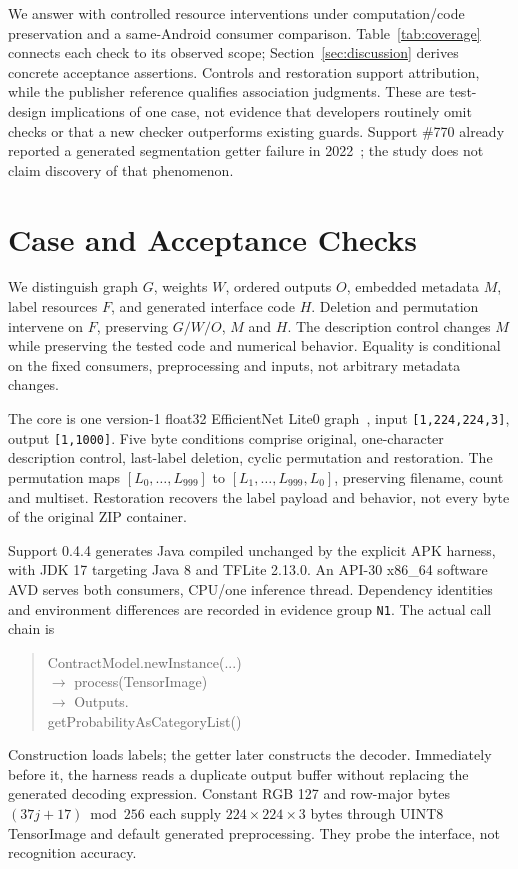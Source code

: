 \documentclass[10pt,conference]{IEEEtran}
\newcommand{\code}[1]{\texttt{#1}}
\begin{document}
We answer with controlled resource interventions under computation/code preservation and a same-Android consumer comparison. Table~\ref{tab:coverage} connects each check to its observed scope; Section~\ref{sec:discussion} derives concrete acceptance assertions. Controls and restoration support attribution, while the publisher reference qualifies association judgments. These are test-design implications of one case, not evidence that developers routinely omit checks or that a new checker outperforms existing guards. Support \#770 already reported a generated segmentation getter failure in 2022~\cite{support770,support770reply}; the study does not claim discovery of that phenomenon.

\section{Case and Acceptance Checks}
\label{sec:setup}
We distinguish graph $G$, weights $W$, ordered outputs $O$, embedded metadata $M$, label resources $F$, and generated interface code $H$. Deletion and permutation intervene on $F$, preserving $G/W/O$, $M$ and $H$. The description control changes $M$ while preserving the tested code and numerical behavior. Equality is conditional on the fixed consumers, preprocessing and inputs, not arbitrary metadata changes.

The core is one version-1 float32 EfficientNet Lite0 graph~\cite{efficientnet}, input \code{[1,224,224,3]}, output \code{[1,1000]}. Five byte conditions comprise original, one-character description control, last-label deletion, cyclic permutation and restoration. The permutation maps $[L_0,\ldots,L_{999}]$ to $[L_1,\ldots,L_{999},L_0]$, preserving filename, count and multiset. Restoration recovers the label payload and behavior, not every byte of the original ZIP container.

Support 0.4.4 generates Java compiled unchanged by the explicit APK harness, with JDK 17 targeting Java 8 and TFLite 2.13.0. An API-30 x86\_64 software AVD serves both consumers, CPU/one inference thread. Dependency identities and environment differences are recorded in evidence group \code{N1}. The actual call chain is
\begin{quote}\small\ttfamily\raggedright
ContractModel.newInstance(...)\\
\(\rightarrow\) process(TensorImage)\\
\(\rightarrow\) Outputs.\\
\hspace*{1em}getProbabilityAsCategoryList()
\end{quote}
Construction loads labels; the getter later constructs the decoder. Immediately before it, the harness reads a duplicate output buffer without replacing the generated decoding expression. Constant RGB 127 and row-major bytes $(37j+17)\bmod256$ each supply $224\times224\times3$ bytes through UINT8 TensorImage and default generated preprocessing. They probe the interface, not recognition accuracy.
\end{document}
